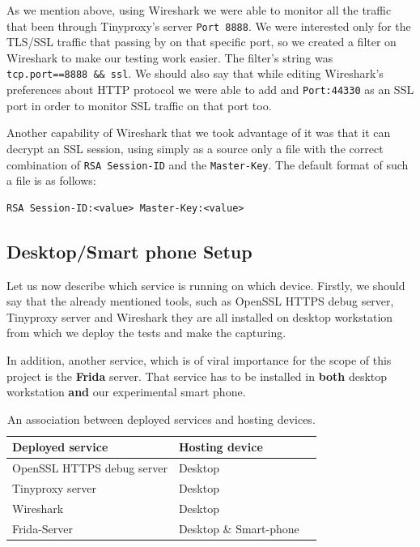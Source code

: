 \documentclass[12pt, a4paper]{report}
\begin{document}
As we mention above, using Wireshark we were able to monitor all the traffic  that been through Tinyproxy's server \texttt{Port 8888}. We were interested only for the TLS/SSL traffic that passing by on that specific port, so we created a filter on Wireshark to make our testing work easier. The filter's string was \texttt{tcp.port==8888 \&\& ssl}. We should also say that while editing Wireshark's preferences about HTTP protocol we were able to add and \texttt{Port:44330} as an SSL port in order to monitor SSL traffic on that port too.

Another capability of Wireshark that we took advantage of it was that it can decrypt an SSL session, using simply as a source only a file with the correct combination of \texttt{RSA Session-ID} and the \texttt{Master-Key}. The default format of such a file is as follows:
\begin{lstlisting}[frame=single, breaklines=true]
RSA Session-ID:<value> Master-Key:<value>		
\end{lstlisting}

\subsection{Desktop/Smart phone Setup}

Let us now describe which service is running on which device. Firstly, we should say that the already mentioned tools, such as OpenSSL HTTPS debug server, Tinyproxy server and Wireshark they are all installed on desktop workstation from which we deploy the tests and make the capturing.

In addition, another service, which is of viral importance for the scope of this project is the \textbf{Frida} server. That service has to be installed in \textbf{both} desktop workstation \textbf{and} our experimental smart phone.

\begin{table}[h]
\centering
    \begin{tabular}{ || l || l || p{5cm} |}
    \hline
    \textbf{Deployed service} & \textbf{Hosting device} \\ \hline
    OpenSSL HTTPS debug server & Desktop \\ \hline 
    Tinyproxy server & Desktop \\ \hline
    Wireshark & Desktop \\ \hline
    Frida-Server & Desktop \& Smart-phone \\ \hline
    \end{tabular}
    \caption{An association between deployed services and hosting devices.}
\end{table}
\end{document}
